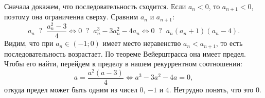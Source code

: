\documentclass{article}
\begin{document}
Сначала докажем, что последовательность сходится. Если $a_n < 0$, то $a_{n+1} < 0$, поэтому она ограниченна сверху. Сравним $a_n$ и $a_{n+1}$:
$$a_n \;\;?\;\; \frac{a_n^2 - 3}{4} \Leftrightarrow 0 \;\;?\;\; a_n^3 - 3a_n^2 - 4a_n \Leftrightarrow 0 \;\;?\;\; a_n(a_n+1)(a_n-4).$$
Видим, что при $a_n \in (-1;0)$ имеет место неравенство $a_n < a_{n+1}$, то есть последовательность возрастает. По теореме Вейерштрасса она имеет предел. Чтобы его найти, перейдем к пределу в нашем рекуррентном соотношении:
$$a = \frac{a^2(a-3)}{4} \Leftrightarrow a^3 - 3a^2 - 4a = 0,$$
откуда предел может быть одним из чисел $0$, $-1$ и $4$. Нетрудно понять, что это $0$.
\end{document}
